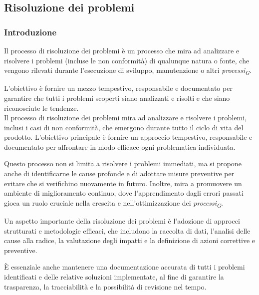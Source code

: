 \subsection{Risoluzione dei problemi}

\subsubsection{Introduzione}
Il processo di risoluzione dei problemi è un processo che mira ad analizzare e risolvere i problemi (incluse le non conformità) di qualunque natura o fonte, che vengono rilevati durante l'esecuzione di sviluppo, manutenzione o altri \textit{processi}\textsubscript{\textit{G}}.

\vspace{0.2cm}

L'obiettivo è fornire un mezzo tempestivo, responsabile e documentato per garantire che tutti i problemi scoperti siano analizzati e risolti e che siano riconosciute le tendenze. \\
Il processo di risoluzione dei problemi mira ad analizzare e risolvere i problemi, inclusi i casi di non conformità, che emergono durante tutto il ciclo di vita del prodotto. L'obiettivo principale è fornire un approccio tempestivo, responsabile e documentato per affrontare in modo efficace ogni problematica individuata.

\vspace{0.2cm}

Questo processo non si limita a risolvere i problemi immediati, ma si propone anche di identificarne le cause profonde e di adottare misure preventive per evitare che si verifichino nuovamente in futuro. Inoltre, mira a promuovere un ambiente di miglioramento continuo, dove l'apprendimento dagli errori passati gioca un ruolo cruciale nella crescita e nell'ottimizzazione dei \textit{processi}\textsubscript{\textit{G}}.

\vspace{0.2cm}

Un aspetto importante della risoluzione dei problemi è l'adozione di approcci strutturati e metodologie efficaci, che includono la raccolta di dati, l'analisi delle cause alla radice, la valutazione degli impatti e la definizione di azioni correttive e preventive.

È essenziale anche mantenere una documentazione accurata di tutti i problemi identificati e delle relative soluzioni implementate, al fine di garantire la trasparenza, la tracciabilità e la possibilità di revisione nel tempo.

